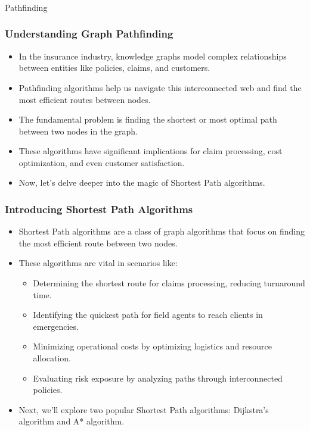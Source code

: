 \begin{frame}[fragile]\frametitle{}
\begin{center}
{\Large Pathfinding}
\end{center}
\end{frame}

\begin{frame}[fragile]\frametitle{Understanding Graph Pathfinding}
\begin{itemize}
\item In the insurance industry, knowledge graphs model complex relationships between entities like policies, claims, and customers.
\item Pathfinding algorithms help us navigate this interconnected web and find the most efficient routes between nodes.
\item The fundamental problem is finding the shortest or most optimal path between two nodes in the graph.
\item These algorithms have significant implications for claim processing, cost optimization, and even customer satisfaction.
\item Now, let's delve deeper into the magic of Shortest Path algorithms.
\end{itemize}
\end{frame}

\begin{frame}[fragile]\frametitle{Introducing Shortest Path Algorithms}
\begin{itemize}
\item Shortest Path algorithms are a class of graph algorithms that focus on finding the most efficient route between two nodes.
\item These algorithms are vital in scenarios like:
\begin{itemize}
\item Determining the shortest route for claims processing, reducing turnaround time.
\item Identifying the quickest path for field agents to reach clients in emergencies.
\item Minimizing operational costs by optimizing logistics and resource allocation.
\item Evaluating risk exposure by analyzing paths through interconnected policies.
\end{itemize}
\item Next, we'll explore two popular Shortest Path algorithms: Dijkstra's algorithm and A* algorithm.
\end{itemize}
\end{frame}

